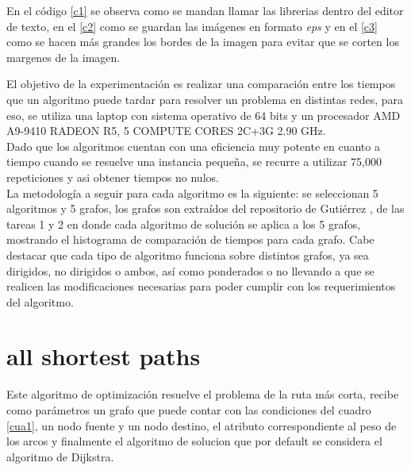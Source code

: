 \documentclass[12pt]{article}
\begin{document}
\vspace{-.2cm}
En el código \ref{c1} se observa como se mandan llamar las librerias dentro del editor de texto, en el \ref{c2} como se guardan las imágenes en formato \textit{eps} y en el \ref{c3} como se hacen más grandes los bordes de la imagen para evitar que se corten los margenes de la imagen.

\vspace{.1cm}
 \label{c1}


\vspace{.1cm}
 \label{c2}
 

\newpage
{} \label{c3}


\vspace{.2cm}
El objetivo de la experimentación es realizar una comparación entre los tiempos que un algoritmo puede tardar para resolver un problema en distintas redes, para eso, se utiliza una laptop con sistema operativo de 64 bits y un procesador AMD A9-9410 RADEON R5, 5 COMPUTE CORES 2C+3G 2.90 GHz. \\

Dado que los algoritmos cuentan con una eficiencia muy potente en cuanto a tiempo cuando se resuelve una instancia pequeña, se recurre a utilizar 75,000 repeticiones y asi obtener tiempos no nulos.\\

La metodología a seguir para cada algoritmo es la siguiente: se seleccionan 5 algoritmos y 5 grafos, los grafos son extraídos del repositorio de Gutiérrez \cite{Mar}, de las tareas 1 y 2 en donde cada algoritmo de solución se aplica a los 5 grafos, mostrando el histograma de comparación de tiempos para cada grafo. Cabe destacar que cada tipo de algoritmo funciona sobre distintos grafos, ya sea dirigidos, no dirigidos o ambos, así como ponderados o no llevando a que se realicen las modificaciones necesarias para poder cumplir con los requerimientos del algoritmo.

\newpage
\section{all shortest paths}
Este algoritmo de optimización resuelve el problema de la ruta más corta, recibe como parámetros un grafo que puede contar con las condiciones del cuadro \ref{cua1}, un nodo fuente y un nodo destino, el atributo correspondiente al peso de los arcos y finalmente el algoritmo de solucion que por default se considera el algoritmo de Dijkstra.\\
\end{document}
